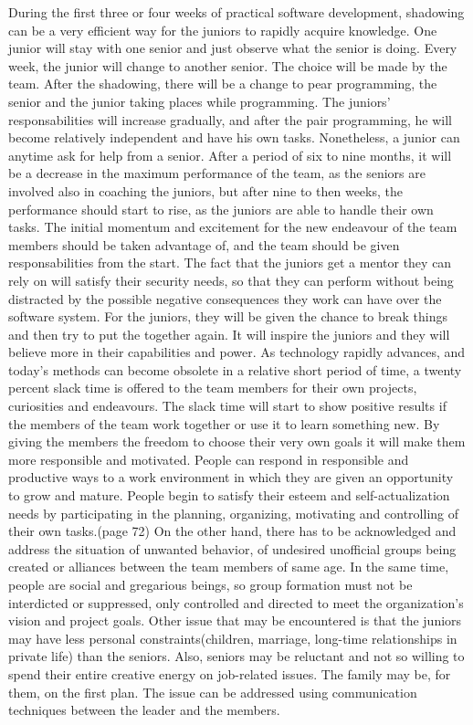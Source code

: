 \documentclass[conference]{IEEEtran}
\begin{document}
During the first three or four weeks of practical software development, shadowing can be a very efficient way for the juniors to rapidly acquire knowledge. One junior will stay with one senior and just observe what the senior is doing. Every week, the junior will change to another senior. The choice will be made by the team. After the shadowing, there will be a change to pear programming, the senior and the junior taking places while programming. The juniors' responsabilities will increase gradually, and after the pair programming, he will become relatively independent and have his own tasks. Nonetheless, a junior can anytime ask for help from a senior. After a period of six to nine months, it will be a decrease in the maximum performance of the team, as the seniors are involved also in coaching the juniors, but after nine to then weeks, the performance should start to rise, as the juniors are able to handle their own tasks. 
\newline\indent
The initial momentum and excitement for the new endeavour of the team members should be taken advantage of, and the team should be given responsabilities from the start. The fact that the juniors get a mentor they can rely on will satisfy their security needs, so that they can perform without being distracted by the possible negative consequences they work can have over the software system.
For the juniors, they will be given the chance to break things and then try to put the together again. It will inspire the juniors and they will believe more in their capabilities and power.
\newline\indent
As technology rapidly advances, and today's methods can become obsolete in a relative short period of time, a twenty percent slack time is offered to the team members for their own projects, curiosities and endeavours. The slack time will start to show positive results if the members of the team work together or use it to learn something new. By giving the members the freedom to choose their very own goals it will make them more responsible and motivated. People can respond in responsible and productive ways to a work environment in which they are given an opportunity to grow and mature. People begin to satisfy their esteem and self-actualization needs by participating in the planning, organizing, motivating and controlling of their own tasks.(page 72)
\newline\indent
On the other hand, there has to be acknowledged and address the situation of unwanted behavior, of undesired unofficial groups being created or alliances between the team members of same age. In the same time, people are social and gregarious beings, so group formation must not be interdicted or suppressed, only controlled and directed to meet the organization's vision and project goals.
\newline\indent
Other issue that may be encountered is that the juniors may have less personal constraints(children, marriage, long-time relationships in private life) than the seniors. Also, seniors may be reluctant and not so willing to spend their entire creative energy on job-related issues. The family may be, for them, on the first plan. The issue can be addressed using communication techniques between the leader and the members.
\newpage
\end{document}
